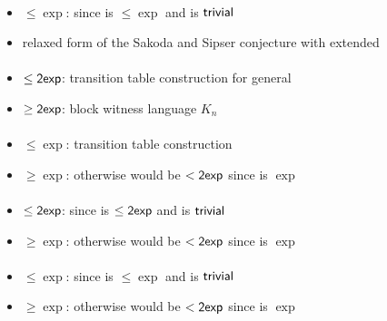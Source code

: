 \paragraph{\TNFA{}\tto\OMODLA}
\begin{itemize}
	\item $\le\exp$: since \hyperref[cost:2NFAto1DFA]{\TNFA{}\tto\ODFA} is $\le\exp$ and \ODFA{}\tto\OMODLA is $\mathsf{trivial}$
	\item relaxed form of the Sakoda and Sipser conjecture with extended \TDFA
\end{itemize}
\paragraph{\OMOLA{}\tto\ODFA}\label{cost:OM1LAto1DFA}
\begin{itemize}
	\item $\le\mathsf{2exp}$: transition table construction for general \OLA \cite{PigPis14}
	\item $\ge\mathsf{2exp}$: block witness language $K_n$ \cite{PigPri23a}
\end{itemize}
\paragraph{\OMOLA{}\tto\ONFA}\label{cost:OM1LAto1NFA}
\begin{itemize}
	\item $\le\exp$: transition table construction \cite{PigPis14}
	\item $\ge\exp$: otherwise \hyperref[cost:OM1LAto1DFA]{\OMOLA{}\tto\ODFA} would be $<\mathsf{2exp}$ since \hyperref[cost:1NFAto1DFA]{\ONFA{}\tto\ODFA} is $\exp$
\end{itemize}
\paragraph{\OMOLA{}\tto\TDFA}
\begin{itemize}
	\item $\le\mathsf{2exp}$: since \hyperref[cost:OM1LAto1DFA]{\OMOLA{}\tto\ODFA} is $\le\mathsf{2exp}$ and \ODFA{}\tto\TDFA is $\mathsf{trivial}$
	\item $\ge\exp$: otherwise \hyperref[cost:OM1LAto1DFA]{\OMOLA{}\tto\ODFA} would be $<\mathsf{2exp}$ since \hyperref[cost:2DFAto1DFA]{\TDFA{}\tto\ODFA} is $\exp$
\end{itemize}
\paragraph{\OMOLA{}\tto\TNFA}
\begin{itemize}
	\item $\le\exp$: since \hyperref[cost:OM1LAto1NFA]{\OMOLA{}\tto\ONFA} is $\le\exp$ and \ONFA{}\tto\TNFA is $\mathsf{trivial}$
	\item $\ge\exp$: otherwise \hyperref[cost:OM1LAto1DFA]{\OMOLA{}\tto\ODFA} would be $<\mathsf{2exp}$ since \hyperref[cost:2NFAto1DFA]{\TNFA{}\tto\ODFA} is $\exp$
\end{itemize}
